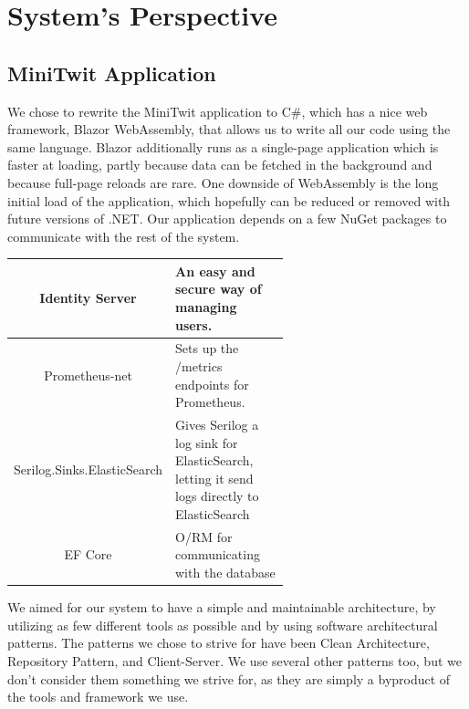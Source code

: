 \section{System's Perspective} 

\subsection{MiniTwit Application}



We chose to rewrite the MiniTwit application to C\#, which has a nice web framework, Blazor WebAssembly, that allows us to write all our code using the same language. Blazor additionally runs as a single-page application which is faster at loading, partly because data can be fetched in the background and because full-page reloads are rare. One downside of WebAssembly is the long initial load of the application, which hopefully can be reduced or removed with future versions of .NET.
Our application depends on a few NuGet packages to communicate with the rest of the system.

\begin{center}
\begin{tabular}{|c|p{0.6\linewidth}|}
    \hline
    Identity Server & An easy and secure way of managing users. \\
    \hline
    Prometheus-net & Sets up the /metrics endpoints for Prometheus. \\
    \hline
    Serilog.Sinks.ElasticSearch & Gives Serilog a log sink for ElasticSearch, letting it send logs directly to ElasticSearch \\
    \hline
    EF Core & O/RM for communicating with the database\\
    \hline
\end{tabular}
\end{center}

\noindent We aimed for our system to have a simple and maintainable architecture, by utilizing as few different tools as possible and by using software architectural patterns. The patterns we chose to strive for have been Clean Architecture, Repository Pattern, and Client-Server. We use several other patterns too, but we don't consider them something we strive for, as they are simply a byproduct of the tools and framework we use. 

